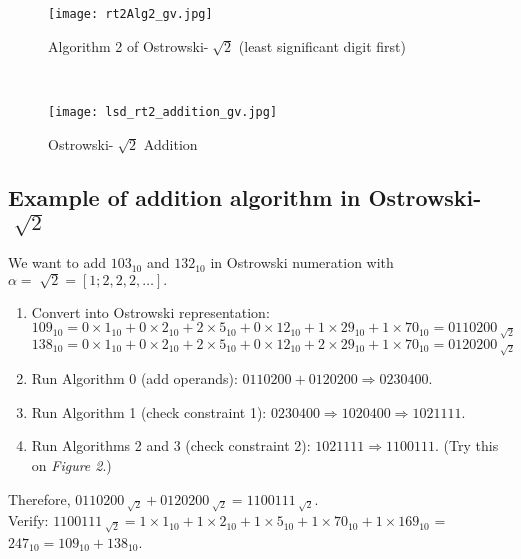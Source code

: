 \documentclass[landscape]{sciposter}
\begin{document}
\begin{multicols}{3}
\begin{minipage}{.45\columnwidth}

\begin{figure}
	\centering
    \texttt{[image: rt2Alg2\_gv.jpg]}
    \caption{Algorithm 2 of Ostrowski-$\sqrt[~]{2}$ (least significant digit first)}
    \label{fig:rt2_alg2}
\end{figure}
\end{minipage} ~~ %
\begin{minipage}{.45\columnwidth}
\begin{figure}
	\centering
    \texttt{[image: lsd\_rt2\_addition\_gv.jpg]}
    \caption{Ostrowski-$\sqrt[~]{2}$ Addition}
    \label{fig:rt2_addition}
\end{figure}
\end{minipage}

\begin{mdframed}[style=MyFrame]
\subsection*{Example of addition algorithm in Ostrowski-$\sqrt[~]{2}$}
\end{mdframed}
\begin{minipage}{\columnwidth}

We want to add $103_{10}$ and $132_{10}$ in Ostrowski numeration with $\alpha = \sqrt[~]{2}= [1; 2,2,2,\dots].$
\begin{enumerate}
\item Convert into Ostrowski representation:\\
$109_{10} = 0\times1_{10}+0\times2_{10}+2\times5_{10}+0\times12_{10}+1\times29_{10}+1\times70_{10}= 0110200_{\sqrt[]{2}}$
\\
$138_{10} = 0\times1_{10}+0\times2_{10}+2\times5_{10}+0\times12_{10}+2\times29_{10}+1\times70_{10} = 0120200_{\sqrt[]{2}}$
\item Run Algorithm 0 (add operands): $0110200 + 0120200 \Rightarrow 0230400$.
\item Run Algorithm 1 (check constraint 1): $0230400 \Rightarrow 1020400 \Rightarrow 1021111$.
\item Run Algorithms 2 and 3 (check constraint 2): $1021111 \Rightarrow 1100111$. (Try this on \emph{Figure 2}.)
\end{enumerate}
Therefore, $0110200_{\sqrt[]{2}}+0120200_{\sqrt[]{2}}=1100111_{\sqrt[]{2}}$.\\
Verify:
$1100111_{\sqrt[]{2}}  = 1\times1_{10}+1\times2_{10}+1\times5_{10}+1\times70_{10}+1\times169_{10}$ = $247_{10} = 109_{10}+138_{10}$.\\


\end{minipage}
\end{multicols}
\end{document}
